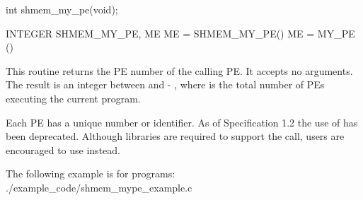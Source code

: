 
\begin{apidefinition}

\begin{Csynopsis}
int shmem_my_pe(void);
\end{Csynopsis}

\begin{Fsynopsis}
INTEGER SHMEM_MY_PE, ME
ME = SHMEM_MY_PE()
ME = MY_PE ()
\end{Fsynopsis}

\begin{apiarguments}
\end{apiarguments}

\apidescription
{
    This routine returns the \ac{PE} number of the calling \ac{PE}.  It accepts no
    arguments.  The result is an integer between  and  -
    , where  is the total number of \ac{PE}s executing the
    current program.
}


\apinotes
{
    Each \ac{PE} has a unique number or identifier. As of \openshmem Specification
    1.2 the use of  has been deprecated. Although \openshmem
    libraries are required to support the call, users are encouraged to use
     instead.
}

\begin{apiexamples}

\apicexample
    {The following  example is for \CorCpp{} programs:}
    {./example_code/shmem_mype_example.c}
    {}

\end{apiexamples}

\end{apidefinition}
